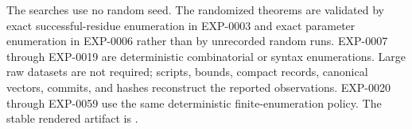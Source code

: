 \documentclass[11pt]{article}
\begin{document}
The searches use no random seed. The randomized theorems are validated by
exact successful-residue enumeration in EXP-0003 and exact parameter
enumeration in EXP-0006 rather than by unrecorded random runs. EXP-0007
through EXP-0019 are deterministic combinatorial or syntax
enumerations. Large raw
datasets are not required; scripts, bounds, compact records, canonical
vectors, commits, and hashes reconstruct the reported observations. EXP-0020
through EXP-0059 use the same deterministic finite-enumeration policy. The
stable rendered artifact is .


\small

\end{document}
